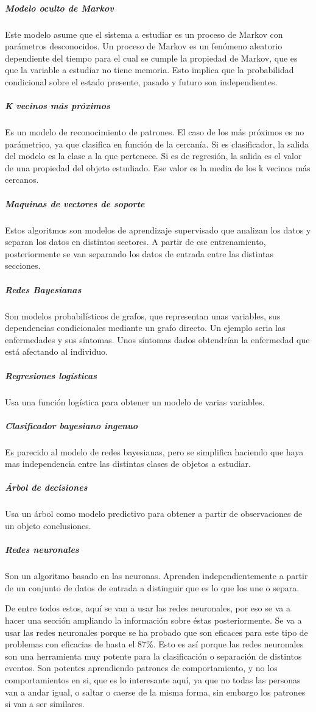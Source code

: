 \documentclass[12pt]{article}
\numberwithin{equation}{section}
\begin{document}
{\subparagraph{Modelo oculto de Markov} Este modelo asume que el sistema a estudiar es un proceso de Markov con parámetros desconocidos. Un proceso de Markov es un fenómeno aleatorio dependiente del tiempo para el cual se cumple la propiedad de Markov, que es que la variable a estudiar no tiene memoria. Esto implica que la probabilidad condicional sobre el estado presente, pasado y futuro son independientes.

\subparagraph{K vecinos más próximos} Es un modelo de reconocimiento de patrones. El caso de los más próximos es no parámetrico, ya que clasifica en función de la cercanía. Si es clasificador, la salida del modelo es la clase a la que pertenece. Si es de regresión, la salida es el valor de una propiedad del objeto estudiado. Ese valor es la media de los k vecinos más cercanos.

\subparagraph{Maquinas de vectores de soporte} Estos algoritmos son modelos de aprendizaje supervisado que analizan los datos y separan los datos en distintos sectores. A partir de ese entrenamiento, posteriormente se van separando los datos de entrada entre las distintas secciones.

\subparagraph{Redes Bayesianas} Son modelos probabilísticos de grafos, que representan unas variables, sus dependencias condicionales mediante un grafo directo. Un ejemplo seria las enfermedades y sus síntomas. Unos síntomas dados obtendrían la enfermedad que está afectando al individuo.

\subparagraph{Regresiones logísticas} Usa una función logística para obtener un modelo de varias variables.

\subparagraph{Clasificador bayesiano ingenuo} Es parecido al modelo de redes bayesianas, pero se simplifica haciendo que haya mas independencia entre las distintas clases de objetos a estudiar.

\subparagraph{Árbol de decisiones} Usa un árbol como modelo predictivo para obtener a partir de observaciones de un objeto conclusiones.

\subparagraph{Redes neuronales} Son un algoritmo basado en las neuronas. Aprenden independientemente a partir de un conjunto de datos de entrada a distinguir que es lo que los une o separa.

De entre todos estos, aquí se van a usar las redes neuronales, por eso se va a hacer una sección ampliando la información sobre éstas posteriormente. Se va a usar las redes neuronales porque se ha probado que son eficaces para este tipo de problemas\cite{s131013099} con eficacias de hasta el 87\%. Esto es así porque las redes neuronales son una herramienta muy potente para la clasificación o separación de distintos eventos. Son potentes aprendiendo patrones de comportamiento, y no los comportamientos en si, que es lo interesante aquí, ya que no todas las personas van a andar igual, o saltar o caerse de la misma forma, sin embargo los patrones si van a ser similares.

}
\end{document}

